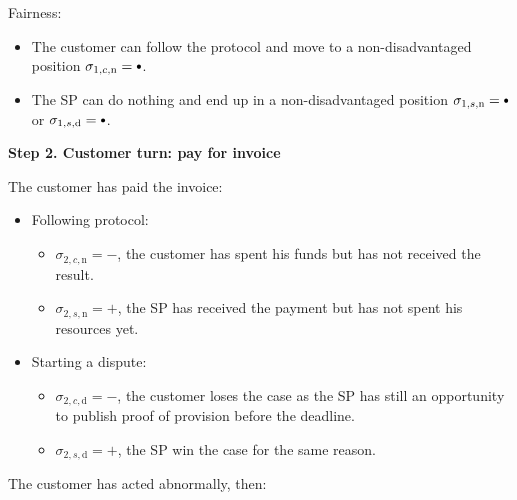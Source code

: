 \documentclass{ieeeaccess}
\newcommand\sbullet[1][.75]{\mathbin{\ThisStyle{\vcenter{\hbox{%
  \scalebox{#1}{$\SavedStyle\bullet$}}}}}%
}
\begin{document}
Fairness:

\begin{itemize}

\item
  The customer can follow the protocol and move to a non-disadvantaged position \(\sigma_{1, c, \mathrm{n}} = \sbullet\).
\item
  The SP can do nothing and end up in a non-disadvantaged position \(\sigma_{1, s, \mathrm{n}} = \sbullet \) or \(\sigma_{1, s, \mathrm{d}} = \sbullet \).
\end{itemize}

\noindent \textbf
{Step 2. Customer turn: pay for invoice}\label{step-2-pay-for-invoice}

The customer has paid the invoice:

\begin{itemize}
\item
  Following protocol:
  \begin{itemize}
  \item
    \(\sigma_{2, c, \mathrm{n}} = -\), the customer has spent his funds but has not received the result.
  \item
    \(\sigma_{2, s, \mathrm{n}} = +\), the SP has received the payment but  has not spent his resources yet.
  \end{itemize}
\item
  Starting a dispute:

  \begin{itemize}
  \item
    \(\sigma_{2, c, \mathrm{d}} = -\), the customer loses the case as the SP has still an opportunity to publish proof of provision before the deadline.
  \item
    \(\sigma_{2, s, \mathrm{d}} = +\), the SP win the case for the same reason.
  \end{itemize}
\end{itemize}

The customer has acted abnormally, then:
\end{document}
